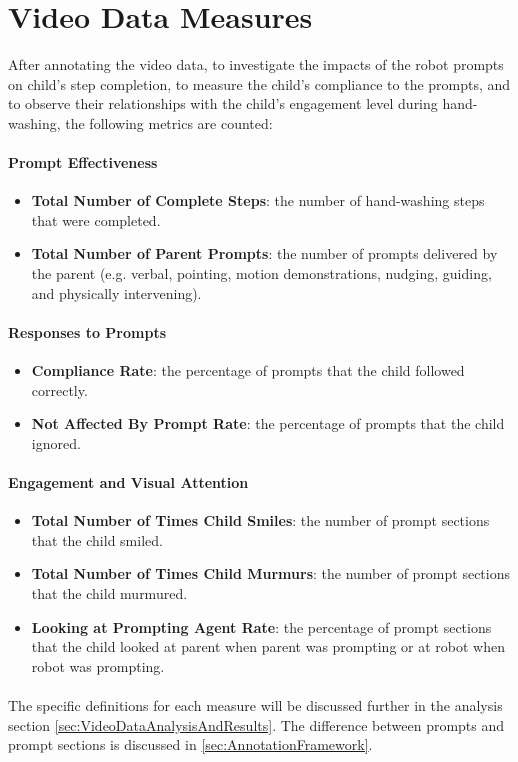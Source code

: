 \section{Video Data Measures}
\label{sec:measures}
After annotating the video data, to investigate the impacts of the robot prompts on child's step completion, to measure the child's compliance to the prompts, and to observe their relationships with the child's engagement level during hand-washing, the following metrics are counted:

\paragraph{Prompt Effectiveness}
\begin{itemize}
	\item \textbf{Total Number of Complete Steps}: the number of hand-washing steps that were completed.
	\item \textbf{Total Number of Parent Prompts}: the number of prompts delivered by the parent (e.g. verbal, pointing, motion demonstrations, nudging, guiding, and physically intervening).
\end{itemize}

\paragraph{Responses to Prompts}
\begin{itemize}
	\item \textbf{Compliance Rate}: the percentage of prompts that the child followed correctly.
	\item \textbf{Not Affected By Prompt Rate}: the percentage of prompts that the child ignored.
\end{itemize}

\paragraph{Engagement and Visual Attention}
\begin{itemize}
	\item \textbf{Total Number of Times Child Smiles}: the number of prompt sections that the child smiled.
	\item \textbf{Total Number of Times Child Murmurs}: the number of prompt sections that the child murmured.
	\item \textbf{Looking at Prompting Agent Rate}: the percentage of prompt sections that the child looked at parent when parent was prompting or at robot when robot was prompting.
\end{itemize}

\paragraph{} %
The specific definitions for each measure will be discussed further in the analysis section \ref{sec:VideoDataAnalysisAndResults}.  The difference between prompts and prompt sections is discussed in \ref{sec:AnnotationFramework}.